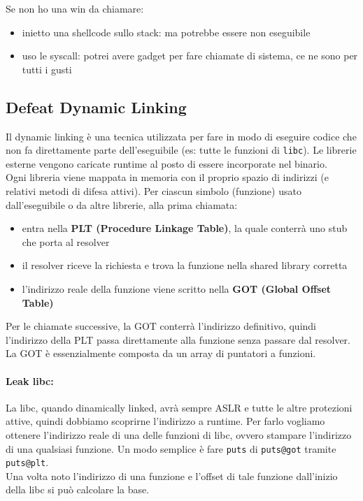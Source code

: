 Se non ho una win da chiamare:
\begin{itemize}
	\item inietto una shellcode sullo stack: ma potrebbe essere non eseguibile
	\item uso le syscall: potrei avere gadget per fare chiamate di sistema, ce ne sono per tutti i gusti
\end{itemize}

\subsection{Defeat Dynamic Linking}

Il dynamic linking è una tecnica utilizzata per fare in modo di eseguire codice che non fa direttamente parte dell'eseguibile (es: tutte le funzioni di \texttt{libc}). Le librerie esterne vengono caricate runtime al posto di essere incorporate nel binario.\\

Ogni libreria viene mappata in memoria con il proprio spazio di indirizzi (e relativi metodi di difesa attivi). Per ciascun simbolo (funzione) usato dall'eseguibile o da altre librerie, alla prima chiamata:
\begin{itemize}
	\item entra nella \textbf{PLT (Procedure Linkage Table)}, la quale conterrà uno stub che porta al resolver
	\item il resolver riceve la richiesta e trova la funzione nella shared library corretta
	\item l'indirizzo reale della funzione viene scritto nella \textbf{GOT (Global Offset Table)}
\end{itemize}
Per le chiamate successive, la GOT conterrà l'indirizzo definitivo, quindi l'indirizzo della PLT passa direttamente alla funzione senza passare dal resolver. La GOT è essenzialmente composta da un array di puntatori a funzioni.\\

\paragraph{Leak libc:} La libc, quando dinamically linked, avrà sempre ASLR e tutte le altre protezioni attive, quindi dobbiamo scoprirne l'indirizzo a runtime. Per farlo vogliamo ottenere l'indirizzo reale di una delle funzioni di libc, ovvero stampare l'indirizzo di una qualsiasi funzione. Un modo semplice è fare \texttt{puts} di \texttt{puts@got} tramite \texttt{puts@plt}.\\

Una volta noto l'indirizzo di una funzione e l'offset di tale funzione dall'inizio della libc si può calcolare la base.